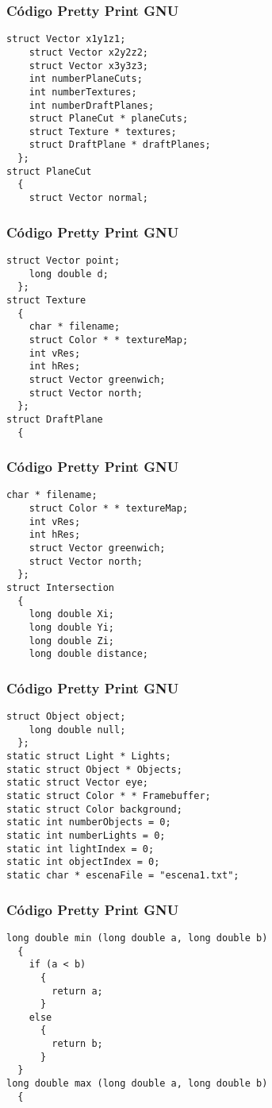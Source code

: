 \documentclass{beamer}
\begin{document}
\begin{frame}[fragile]
\frametitle{C\'odigo Pretty Print GNU}
\begin{lstlisting}[style=CStyle]
    struct Vector x1y1z1;
    struct Vector x2y2z2;
    struct Vector x3y3z3;
    int numberPlaneCuts;
    int numberTextures;
    int numberDraftPlanes;
    struct PlaneCut * planeCuts;
    struct Texture * textures;
    struct DraftPlane * draftPlanes;
  };
struct PlaneCut
  {
    struct Vector normal;
\end{lstlisting}
\end{frame}
\begin{frame}[fragile]
\frametitle{C\'odigo Pretty Print GNU}
\begin{lstlisting}[style=CStyle]
    struct Vector point;
    long double d;
  };
struct Texture
  {
    char * filename;
    struct Color * * textureMap;
    int vRes;
    int hRes;
    struct Vector greenwich;
    struct Vector north;
  };
struct DraftPlane
  {
    \end{lstlisting}
\end{frame}
\begin{frame}[fragile]
\frametitle{C\'odigo Pretty Print GNU}
\begin{lstlisting}[style=CStyle]
    char * filename;
    struct Color * * textureMap;
    int vRes;
    int hRes;
    struct Vector greenwich;
    struct Vector north;
  };
struct Intersection
  {
    long double Xi;
    long double Yi;
    long double Zi;
    long double distance;
\end{lstlisting}
\end{frame}
\begin{frame}[fragile]
\frametitle{C\'odigo Pretty Print GNU}
\begin{lstlisting}[style=CStyle]
    struct Object object;
    long double null;
  };
static struct Light * Lights;
static struct Object * Objects;
static struct Vector eye;
static struct Color * * Framebuffer;
static struct Color background;
static int numberObjects = 0;
static int numberLights = 0;
static int lightIndex = 0;
static int objectIndex = 0;
static char * escenaFile = "escena1.txt";
\end{lstlisting}
\end{frame}
\begin{frame}[fragile]
\frametitle{C\'odigo Pretty Print GNU}
\begin{lstlisting}[style=CStyle]
long double min (long double a, long double b)
  {
    if (a < b)
      {
        return a;
      }
    else
      {
        return b;
      }
  }
long double max (long double a, long double b)
  {
    \end{lstlisting}
\end{frame}
\end{document}
